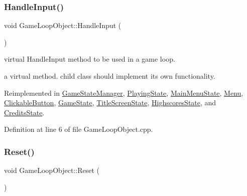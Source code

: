 \mbox{\label{class_game_loop_object_aecab111d504b7f4590045ca7c83a36de}} 
\subsubsection{\texorpdfstring{Handle\+Input()}{HandleInput()}}
{\footnotesize\ttfamily void Game\+Loop\+Object\+::\+Handle\+Input (\begin{DoxyParamCaption}{ }\end{DoxyParamCaption})\hspace{0.3cm}{\ttfamily [virtual]}}



virtual Handle\+Input method to be used in a game loop. 

a virtual method. child class should implement its own functionality. 

Reimplemented in \hyperlink{class_game_state_manager_a6546ed46ea23d9a9206c7d540e8b3b3b}{Game\+State\+Manager}, \hyperlink{class_playing_state_ab61fc6f59f00ccf5db80f67d5e4c50a1}{Playing\+State}, \hyperlink{class_main_menu_state_ac332ae234d282f4e6657ee9d0685b7ff}{Main\+Menu\+State}, \hyperlink{class_menu_a0cb3596524ed7fd021f999860b563bf8}{Menu}, \hyperlink{class_clickable_button_a939a1f2a5414c37e9c1c1310db576224}{Clickable\+Button}, \hyperlink{class_game_state_a8bce2828cee99ae7c07322804531fd01}{Game\+State}, \hyperlink{class_title_screen_state_a1bad900daba7f6481632a58212f39af0}{Title\+Screen\+State}, \hyperlink{class_highscores_state_aa8ce1b29acad9790ff065e5c96635c85}{Highscores\+State}, and \hyperlink{class_credits_state_a63557b2290a2febb88e78ae90754a7ec}{Credits\+State}.



Definition at line 6 of file Game\+Loop\+Object.\+cpp.

\mbox{\label{class_game_loop_object_af61e973be170cb9437a5b7d9ecd6ef53}} 
\subsubsection{\texorpdfstring{Reset()}{Reset()}}
{\footnotesize\ttfamily void Game\+Loop\+Object\+::\+Reset (\begin{DoxyParamCaption}{ }\end{DoxyParamCaption})\hspace{0.3cm}{\ttfamily [virtual]}}



